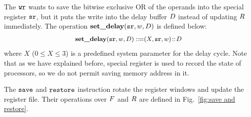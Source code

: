 The $\texttt{wr}$ wants to save the bitwise exclusive OR of
the operands into the special register $\texttt{sr}$, but
it puts the write into the delay buffer $D$
instead of updating $R$ immediately.
The operation $\textbf{set\_delay}(\texttt{sr}, w, D)$
is defined below:
\[
	\small
	\begin{array}{l}
		\textbf{set\_delay}(\texttt{sr}, w, D) ::\!\!{=} (X, \texttt{sr}, w) 
		\!::\! D \\
	\end{array}
\]
where $X$ ($0 \leq X \leq 3$) is a
predefined system parameter for the delay cycle. Note that 
as we have explained before, special register is used 
to record the state of processors, so we do not permit saving 
memory address in it. 

The $\texttt{save}$ and $\texttt{restore}$ instruction rotate
the register windows and update the register file.
Their operations over $F$ and $R$
are defined in Fig.~\ref{fig:save and restore}.

%
%
%
